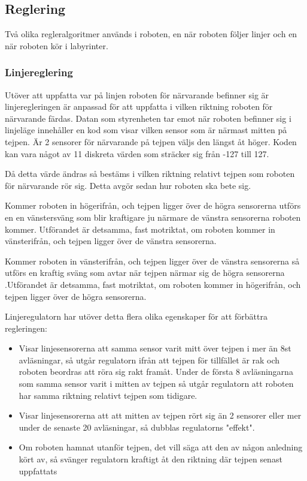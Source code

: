 \subsection{Reglering}
Två olika regleralgoritmer används i roboten, en när roboten följer linjer och
en när roboten kör i labyrinter.
\subsubsection{Linjereglering}
Utöver att uppfatta var på linjen roboten för närvarande befinner sig är 
linjeregleringen är anpassad för att uppfatta i vilken riktning roboten för 
närvarande färdas. Datan som styrenheten tar emot när roboten befinner sig i 
linjeläge innehåller en kod som visar vilken sensor som är närmast mitten på 
tejpen. Är 2 sensorer för närvarande på tejpen väljs den längst åt höger. 
Koden kan vara något av 11 diskreta värden som sträcker sig från -127 till 127.

Då detta värde ändras så bestäms i vilken riktning relativt tejpen som 
roboten för närvarande rör sig. Detta avgör sedan hur roboten ska bete sig.

Kommer roboten in högerifrån, och tejpen ligger över de högra sensorerna 
utförs en en vänstersväng som blir kraftigare ju närmare de vänstra 
sensorerna roboten kommer. Utförandet är detsamma, fast motriktat, om roboten 
kommer in vänsterifrån, och tejpen ligger över de vänstra sensorerna.

Kommer roboten in vänsterifrån, och tejpen ligger över de vänstra sensorerna 
så utförs en kraftig sväng som avtar när tejpen närmar sig de högra sensorerna
.Utförandet är detsamma, fast motriktat, om roboten kommer in högerifrån, och 
tejpen ligger över de högra sensorerna.


Linjeregulatorn har utöver detta flera olika egenskaper för att förbättra 
regleringen:
\begin{itemize}
\item Visar linjesensorerna att samma sensor varit mitt över tejpen i mer än 8st avläsningar, så utgår regulatorn ifrån att tejpen för tillfället är rak och roboten beordras att röra sig rakt framåt. Under de första 8 avläsningarna som samma sensor varit i mitten av tejpen så utgår regulatorn att roboten har samma riktning relativt tejpen som tidigare.
\item Visar linjesensorerna att att mitten av tejpen rört sig än 2 sensorer eller mer under de senaste 20 avläsningar, så dubblas regulatorns "effekt".
\item Om roboten hamnat utanför tejpen, det vill säga att den av någon anledning kört av, så svänger regulatorn kraftigt åt den riktning där tejpen senast uppfattats
\end{itemize}



